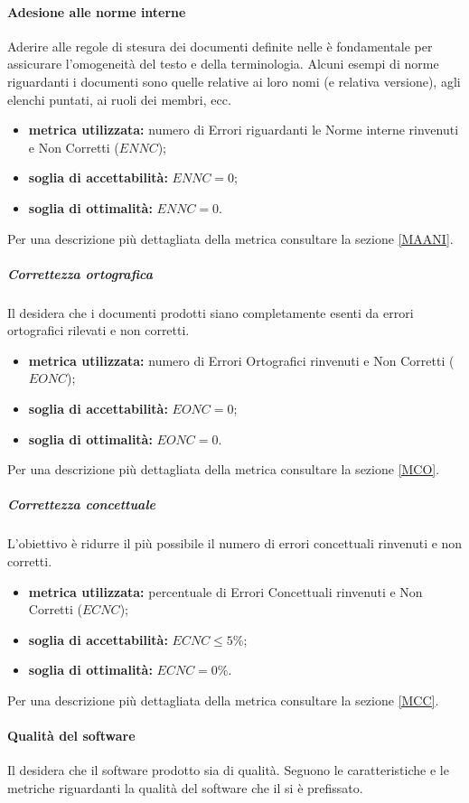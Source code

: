 \paragraph{Adesione alle norme interne}
\label{OAANI}
Aderire alle regole di stesura dei documenti definite nelle \ndpv{} è fondamentale per assicurare l'omogeneità del testo e della terminologia. Alcuni esempi di norme riguardanti i documenti sono quelle relative ai loro nomi (e relativa versione), agli elenchi puntati, ai ruoli dei membri, ecc.
\begin{itemize}
	\item \textbf{metrica utilizzata:} numero di Errori riguardanti le Norme interne rinvenuti e Non Corretti ($ENNC$);
	\item \textbf{soglia di accettabilità:} $ENNC=0$;
	\item \textbf{soglia di ottimalità:} $ENNC=0$.
\end{itemize}
Per una descrizione più dettagliata della metrica consultare la sezione \ref{MAANI}.

\subparagraph{Correttezza ortografica}
\label{OCO}
Il  desidera che i documenti prodotti siano completamente esenti da errori ortografici rilevati e non corretti.
\begin{itemize}
	\item \textbf{metrica utilizzata:} numero di Errori Ortografici rinvenuti e Non Corretti ($EONC$);
	\item \textbf{soglia di accettabilità:} $EONC=0$;
	\item \textbf{soglia di ottimalità:} $EONC=0$.
\end{itemize}
Per una descrizione più dettagliata della metrica consultare la sezione \ref{MCO}.

\subparagraph{Correttezza concettuale}
\label{OCC}
L'obiettivo è ridurre il più possibile il numero di errori concettuali rinvenuti e non corretti.
\begin{itemize}
	\item \textbf{metrica utilizzata:} percentuale di Errori Concettuali rinvenuti e Non Corretti ($ECNC$);
	\item \textbf{soglia di accettabilità:} $ECNC\leq 5\%$;
	\item \textbf{soglia di ottimalità:} $ECNC=0\%$.
\end{itemize}
Per una descrizione più dettagliata della metrica consultare la sezione \ref{MCC}.

\paragraph{Qualità del software}
Il  desidera che il software prodotto sia di qualità.
Seguono le caratteristiche e le metriche riguardanti la qualità del software che il  si è prefissato.


